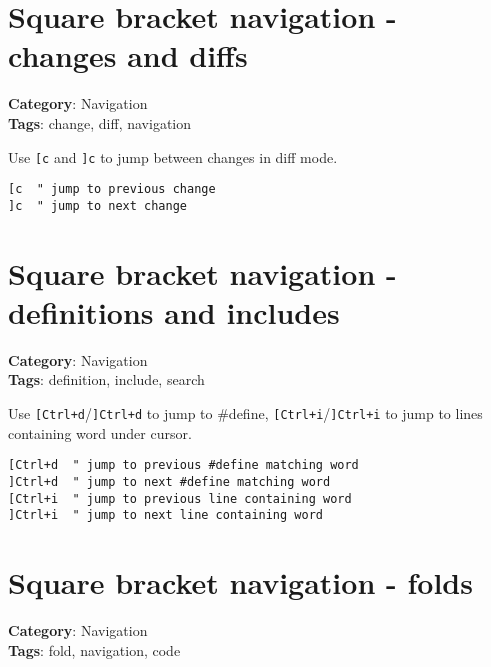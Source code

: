 {{{{{{{{{{\section{Square bracket navigation - changes and diffs}

\textbf{Category}: Navigation\\ \textbf{Tags}: change, diff, navigation
\vspace{0.5cm}

Use {\footnotesize \Verb§[c§} and {\footnotesize \Verb§]c§} to jump between changes in diff mode.

\begin{Exa*}{}
\begin{Verbatim}[fontsize=\footnotesize, breaklines, breakanywhere]
[c  " jump to previous change
]c  " jump to next change
\end{Verbatim}
\end{Exa*}

\section{Square bracket navigation - definitions and includes}

\textbf{Category}: Navigation\\ \textbf{Tags}: definition, include, search
\vspace{0.5cm}

Use {\footnotesize \Verb§[Ctrl+d§}/{\footnotesize \Verb§]Ctrl+d§} to jump to \#define, {\footnotesize \Verb§[Ctrl+i§}/{\footnotesize \Verb§]Ctrl+i§} to jump to lines containing word under cursor.

\begin{Exa*}{}
\begin{Verbatim}[fontsize=\footnotesize, breaklines, breakanywhere]
[Ctrl+d  " jump to previous #define matching word
]Ctrl+d  " jump to next #define matching word
[Ctrl+i  " jump to previous line containing word
]Ctrl+i  " jump to next line containing word
\end{Verbatim}
\end{Exa*}

\section{Square bracket navigation - folds}

\textbf{Category}: Navigation\\ \textbf{Tags}: fold, navigation, code
\vspace{0.5cm}

}}}}}}}}}}
